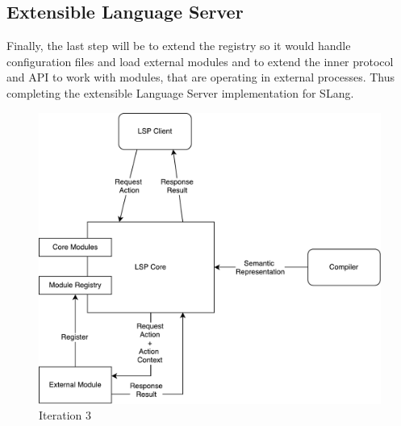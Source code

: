 \subsection{Extensible Language Server}
Finally, the last step will be to extend the registry so it would handle configuration files
and load external modules and to extend the inner protocol and API to work with modules, that are operating
in external processes.
Thus completing the extensible Language Server implementation for SLang.

\begin{figure}[H]
    \centering
    \includegraphics[width=.6\textwidth]{figs/ls_iteration_4.pdf}
    \caption{Iteration 3}
\end{figure}



 





